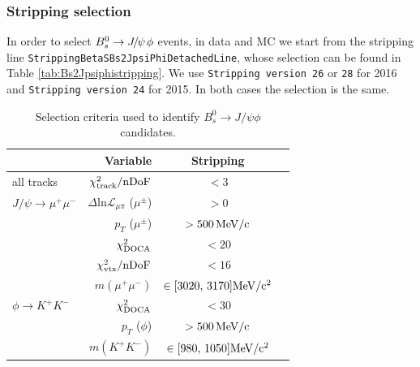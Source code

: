 \subsubsection{Stripping selection}

In order to select  $B^0_s\to{\ensuremath{{J\mskip -3mu/\mskip -2mu\psi\mskip 2mu}}}\phi$ events, in data and MC we start from the stripping line {\tt StrippingBetaSBs2JpsiPhiDetachedLine}, whose selection can be found in Table \ref{tab:Bs2Jpsiphistripping}.
We use {\tt Stripping version 26} or {\tt 28} for 2016 and {\tt Stripping version 24} for 2015. In both cases the selection is the same.\\

 \renewcommand{\arraystretch}{1.2}
\begin{table}[h]
  \centering
  \caption{Selection criteria used to identify $B^0_s \to J/\psi \phi$ candidates.}
    \begin{tabular}{lrcc}\hline\hline
            &  Variable                        & Stripping \\
      \hline
      all tracks                       & $\chi^2_{\rm track}/{\rm nDoF}$                                & $<3$                     \\
       \hline
       $J/\psi \to \mu^{+} \mu^{-}$      &  $\Delta \mathrm{ln} \mathcal{L}_{{\mu}{\pi}}$ ($\mu^{\pm}$)   & $>0$                      \\
 			               &  $p_{T}$   ($\mu^{\pm}$)                                      & $>500\,\rm MeV/c$             \\
                                       & $\chi^2_{\rm DOCA}$                                           & $ < 20$                    \\
                                       & $\chi^2_{\rm vtx}/{\rm nDoF}$                                 & $ < 16$                    \\
               		               & $m(\mu^+\mu^-)$                                              &  $\in [3020,\,3170]\rm MeV/c^2$ \\
      \hline
      $\phi \to K^+ K^-$                & $\chi^2_{\rm DOCA}$                                           & $ < 30$                    \\
                                       &  $p_{T}$ ($\phi$)                                             & $>500\,\rm MeV/c$              \\
		                       & $m(K^+K^-)$                                                & $\in [980,\,1050]\rm MeV/c^2$                \\

\end{tabular}
\end{table}
